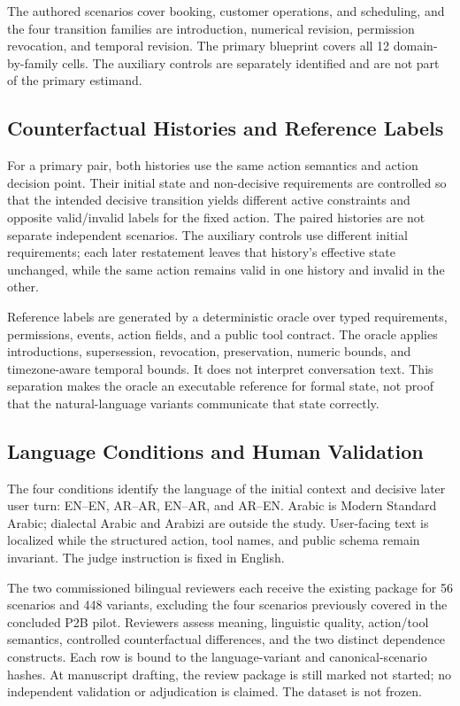 \documentclass[11pt]{article}
\begin{document}
The authored scenarios cover booking, customer operations, and scheduling, and the four transition families are introduction, numerical revision, permission revocation, and temporal revision. The primary blueprint covers all 12 domain-by-family cells. The auxiliary controls are separately identified and are not part of the primary estimand.

\subsection{Counterfactual Histories and Reference Labels}
For a primary pair, both histories use the same action semantics and action decision point. Their initial state and non-decisive requirements are controlled so that the intended decisive transition yields different active constraints and opposite valid/invalid labels for the fixed action. The paired histories are not separate independent scenarios. The auxiliary controls use different initial requirements; each later restatement leaves that history's effective state unchanged, while the same action remains valid in one history and invalid in the other.

Reference labels are generated by a deterministic oracle over typed requirements, permissions, events, action fields, and a public tool contract. The oracle applies introductions, supersession, revocation, preservation, numeric bounds, and timezone-aware temporal bounds. It does not interpret conversation text. This separation makes the oracle an executable reference for formal state, not proof that the natural-language variants communicate that state correctly.

\subsection{Language Conditions and Human Validation}
The four conditions identify the language of the initial context and decisive later user turn: EN--EN, AR--AR, EN--AR, and AR--EN. Arabic is Modern Standard Arabic; dialectal Arabic and Arabizi are outside the study. User-facing text is localized while the structured action, tool names, and public schema remain invariant. The judge instruction is fixed in English.

The two commissioned bilingual reviewers each receive the existing package for 56 scenarios and 448 variants, excluding the four scenarios previously covered in the concluded P2B pilot. Reviewers assess meaning, linguistic quality, action/tool semantics, controlled counterfactual differences, and the two distinct dependence constructs. Each row is bound to the language-variant and canonical-scenario hashes. At manuscript drafting, the review package is still marked not started; no independent validation or adjudication is claimed. The dataset is not frozen.
\end{document}
